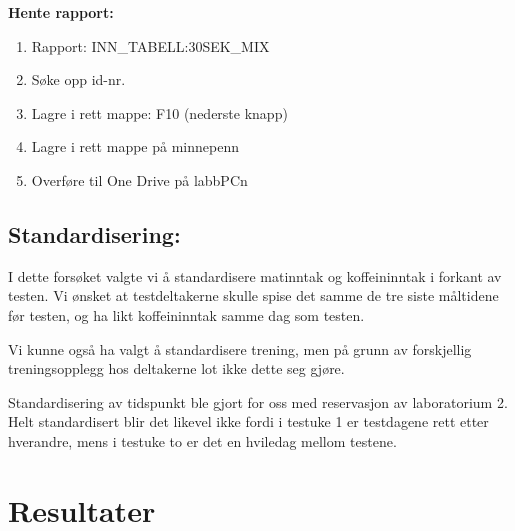 \documentclass[
  letterpaper,
  DIV=11,
  numbers=noendperiod]{scrreprt}
\providecommand{\tightlist}{%
  \setlength{\itemsep}{0pt}\setlength{\parskip}{0pt}}\usepackage{longtable,booktabs,array}
\begin{document}
\textbf{Hente rapport:}

\begin{enumerate}
\def\labelenumi{\arabic{enumi}.}
\tightlist
\item
  Rapport: INN\_TABELL:30SEK\_MIX
\item
  Søke opp id-nr.
\item
  Lagre i rett mappe: F10 (nederste knapp)
\item
  Lagre i rett mappe på minnepenn
\item
  Overføre til One Drive på labbPCn
\end{enumerate}

\section{Standardisering:}\label{standardisering}

I dette forsøket valgte vi å standardisere matinntak og koffeininntak i
forkant av testen. Vi ønsket at testdeltakerne skulle spise det samme de
tre siste måltidene før testen, og ha likt koffeininntak samme dag som
testen.

Vi kunne også ha valgt å standardisere trening, men på grunn av
forskjellig treningsopplegg hos deltakerne lot ikke dette seg gjøre.

Standardisering av tidspunkt ble gjort for oss med reservasjon av
laboratorium 2. Helt standardisert blir det likevel ikke fordi i testuke
1 er testdagene rett etter hverandre, mens i testuke to er det en
hviledag mellom testene.


\chapter{Resultater}\label{resultater}
\end{document}
